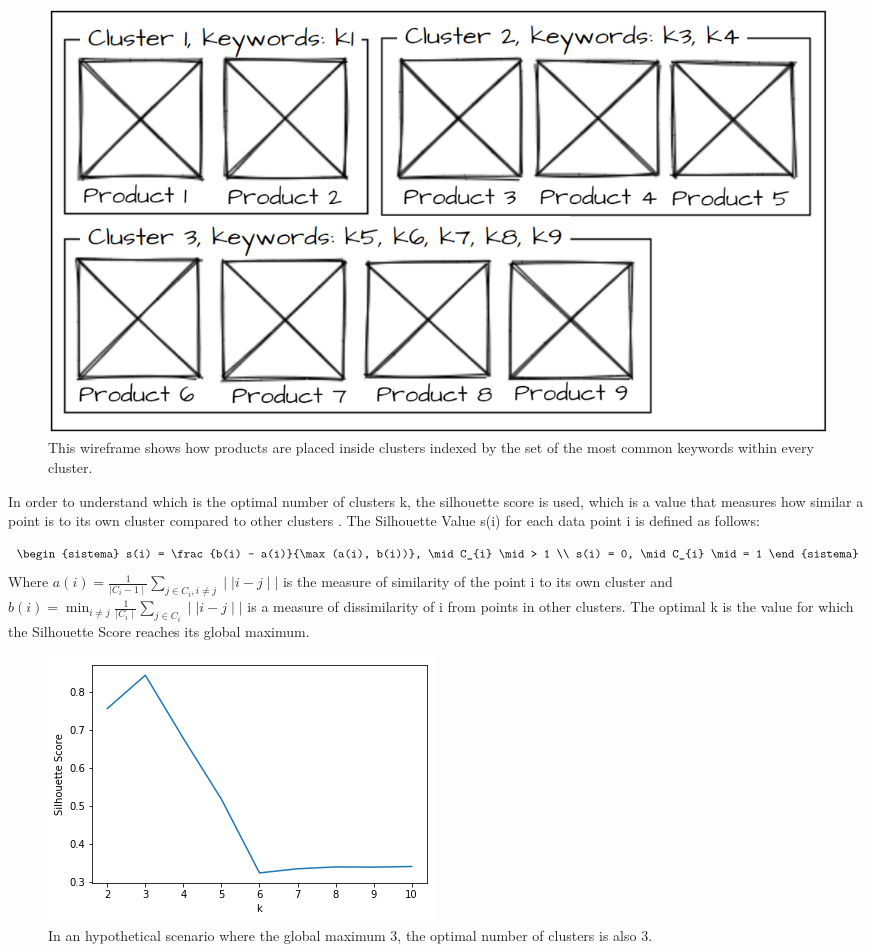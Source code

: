 \begin{figure}[h!]
	\centering
	\includegraphics[scale=0.7]{img/clusters.png}
	\caption{This wireframe shows how products are placed inside clusters indexed by the set of the most common keywords within every cluster.}
	\label{Implementation:Clusters}
\end{figure}

In order to understand which is the optimal number of clusters k, the silhouette score is used, which is a value that measures how similar a point is to its own cluster compared to other clusters \cite{silhouette}. The Silhouette Value s(i) for each data point i is defined as follows: 

\[ 
\begin{sistema} 
s(i) = \frac{b(i) - a(i)}{\max (a(i), b(i))}, \mid C_{i} \mid > 1 \\ 
s(i) = 0, \mid C_{i} \mid = 1 
\end{sistema} 
\]
Where \(a(i) = \frac{1}{\mid C_{i} - 1 \mid} \sum\limits_{j \in C_{i}, i \neq j} \mid \mid i - j \mid \mid \) is the measure of similarity of the point i to its own cluster and \(b(i) = \min_{i \neq j} \frac{1}{\mid C_{i} \mid} \sum\limits_{j \in C_{i}} \mid \mid i - j \mid \mid \) is a measure of dissimilarity of i from points in other clusters. The optimal k is the value for which the Silhouette Score reaches its global maximum.


\begin{figure}[h!]
	\centering
	\includegraphics[scale=0.8]{img/silhouette.png}
	\caption{In an hypothetical scenario where the global maximum 3, the optimal number of clusters is also 3.}
	\label{Results:Silhouette Method}
\end{figure}

